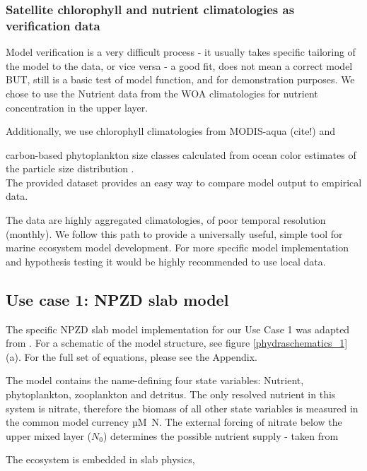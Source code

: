 \documentclass[journal abbreviation, manuscript]{copernicus}
\begin{document}
\subsubsection{Satellite chlorophyll and nutrient climatologies as verification data}
Model verification is a very difficult process
- it usually takes specific tailoring of the model to the data, or vice versa \cite{Schartau2017}
- a good fit, does not mean a correct model \cite{RykielJr1996}\\

BUT, still is a basic test of model function, and for demonstration purposes.
We chose to use the Nutrient data from the WOA climatologies for nutrient concentration in the upper layer.

Additionally, we use chlorophyll climatologies from MODIS-aqua (cite!) and 

carbon-based phytoplankton size classes calculated from ocean color estimates of the particle size distribution \cite{Kostadinov2016Carbon-basedDistribution}.\\

The provided dataset provides an easy way to compare model output to empirical data. 

The data are highly aggregated climatologies, of poor temporal resolution (monthly). We follow this path to provide a universally useful, simple tool for marine ecosystem model development. For more specific model implementation and hypothesis testing it would be highly recommended to use local data.\\


\subsection{Use case 1: NPZD slab model}

The specific NPZD slab model implementation for our Use Case 1 was adapted from \citet{Anderson2015c}. For a schematic of the model structure, see figure \ref{phydraschematics_1} (a). For the full set of equations, please see the Appendix.

The model contains the name-defining four state variables: Nutrient, phytoplankton, zooplankton and detritus.
The only resolved nutrient in this system is nitrate, therefore the biomass of all other state variables is measured in the common model currency \unit{µM N}. The external forcing of nitrate below the upper mixed layer ($N_0$) determines the possible nutrient supply
- taken from 

The ecosystem is embedded in slab physics,
\end{document}
